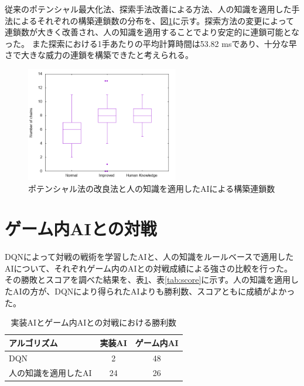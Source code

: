 \documentclass[twocolumn, a4paper]{UECIEresume}
\begin{document}
従来のポテンシャル最大化法、探索手法改善による方法、人の知識を適用した手法によるそれぞれの構築連鎖数の分布を、図\ref{fig:chain}に示す。探索方法の変更によって連鎖数が大きく改善され、人の知識を適用することでより安定的に連鎖可能となった。%
また探索における1手あたりの平均計算時間は53.82 msであり、十分な早さで大きな威力の連鎖を構築できたと考えられる。

\begin{figure}[htb]
  \begin{center}
  \includegraphics[height=5cm]{../graph/chain.png}
  \caption{ポテンシャル法の改良法と人の知識を適用したAIによる構築連鎖数} \label{fig:chain}
\end{center}
\end{figure}

\section{ゲーム内AIとの対戦}
DQNによって対戦の戦術を学習したAIと、人の知識をルールベースで適用したAIについて、それぞれゲーム内のAIとの対戦成績による強さの比較を行った。その勝敗とスコアを調べた結果を、表\ref{tab:win}、表\ref{tab:score}に示す。人の知識を適用したAIの方が、DQNにより得られたAIよりも勝利数、スコアともに成績がよかった。

%


\begin{table}[tbp]
\begin{center}
\caption{実装AIとゲーム内AIとの対戦における勝利数} \label{tab:win}
  \begin{tabular}{|l|c|c|} \hline
アルゴリズム & 実装AI & ゲーム内AI\\ \hline
DQN & 2 & 48\\ \hline
人の知識を適用したAI & 24 & 26\\ \hline
\end{tabular}
\end{center}
\end{table}
\end{document}
